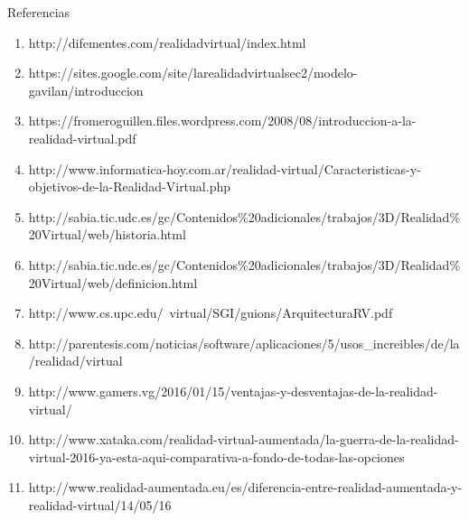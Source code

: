 \documentclass{bmcart}
\begin{document}
\begin{backmatter}
Referencias
\begin{enumerate}
	\item http://difementes.com/realidadvirtual/index.html
	\item https://sites.google.com/site/larealidadvirtualsec2/modelo-gavilan/introduccion
	\item https://fromeroguillen.files.wordpress.com/2008/08/introduccion-a-la-realidad-virtual.pdf
	\item http://www.informatica-hoy.com.ar/realidad-virtual/Caracteristicas-y-objetivos-de-la-Realidad-Virtual.php
	\item http://sabia.tic.udc.es/gc/Contenidos\%20adicionales/trabajos/3D/Realidad\%20Virtual/web/historia.html
	\item http://sabia.tic.udc.es/gc/Contenidos\%20adicionales/trabajos/3D/Realidad\%20Virtual/web/definicion.html
	\item http://www.cs.upc.edu/~virtual/SGI/guions/ArquitecturaRV.pdf
	\item http://parentesis.com/noticias/software/aplicaciones/5/usos\_increibles/de/la/realidad/virtual
	\item http://www.gamers.vg/2016/01/15/ventajas-y-desventajas-de-la-realidad-virtual/
	\item http://www.xataka.com/realidad-virtual-aumentada/la-guerra-de-la-realidad-virtual-2016-ya-esta-aqui-comparativa-a-fondo-de-todas-las-opciones
	\item http://www.realidad-aumentada.eu/es/diferencia-entre-realidad-aumentada-y-realidad-virtual/14/05/16
\end{enumerate}
\end{backmatter}
\end{document}
